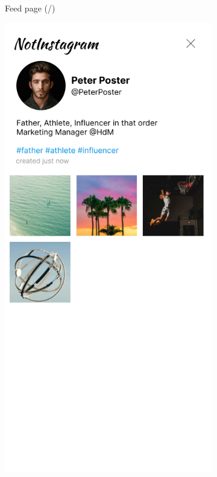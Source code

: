 \documentclass[a4paper, 12pt]{article}
\begin{document}
\begin{figure}[ht!]
\begin{subfigure}{0.49\linewidth}
\begin{center}
    \end{center}
    \caption{Feed page (/)}\label{subfig:index}
  \end{subfigure}
  \begin{subfigure}{0.49\linewidth}
    \begin{center}
      \includegraphics[width=\linewidth, height=0.3\textheight, keepaspectratio,frame]{img/ig-clone/Profil.png}

\end{center}
\end{subfigure}
\end{figure}
\end{document}
